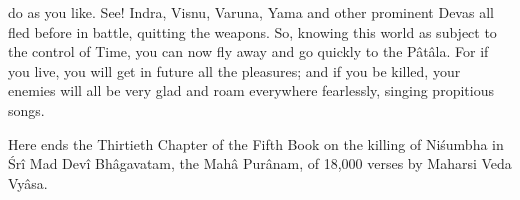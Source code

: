 do as you like. See! Indra, Visnu, Varuna, Yama and other prominent Devas all fled before in battle, quitting the weapons. So, knowing this world as subject to the control of Time, you can now fly away and go quickly to the P\^at\^ala. For if you live, you will get in future all the pleasures; and if you be killed, your enemies will all be very glad and roam everywhere fearlessly, singing propitious songs.

Here ends the Thirtieth Chapter of the Fifth Book on the killing of Ni\'sumbha in \'Sr\^i Mad Dev\^i Bh\^agavatam, the Mah\^a Pur\^anam, of 18,000 verses by Maharsi Veda Vy\^asa.